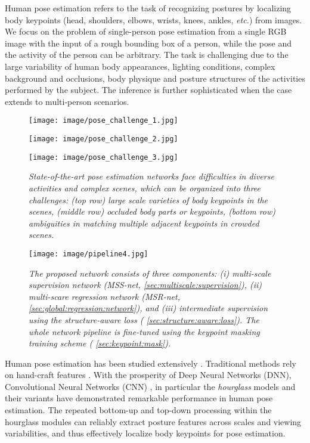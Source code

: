 \documentclass[runningheads]{llncs}
\begin{document}
Human pose estimation refers to the task of recognizing postures by localizing body keypoints (head, shoulders, elbows, wrists, knees, ankles, {\em etc.}) from images. We focus on the problem of single-person pose estimation from a single RGB image with the input of a rough bounding box of a person, while the pose and the activity of the person can be arbitrary. The task is challenging due to the large variability of human body appearances, lighting conditions, complex background and occlusions, body physique and posture structures of the activities performed by the subject.  The inference is further sophisticated when the case extends to multi-person scenarios. 

\begin{figure*}[t]
\centerline{
\texttt{[image: image/pose\_challenge\_1.jpg]}
}
\centerline{
\texttt{[image: image/pose\_challenge\_2.jpg]}
}
\centerline{
\texttt{[image: image/pose\_challenge\_3.jpg]}
}
\caption{\em \small 
State-of-the-art pose estimation networks face difficulties in
diverse activities and complex scenes, which can be organized into three challenges:
(top row) large scale varieties of body keypoints in the scenes,
(middle row) occluded body parts or keypoints,
(bottom row) ambiguities in matching multiple adjacent keypoints in crowded scenes.
}
\label{fig:pose_challenge}
\end{figure*}



\begin{figure*}[t]
\centerline{
  \texttt{[image: image/pipeline4.jpg]}
}
\caption{\em \small 
The proposed network consists of three components: 
{\em (i)} {\em multi-scale supervision network} (MSS-net,  \ref{sec:multiscale:supervision}),
{\em (ii)} {\em multi-scare regression network} (MSR-net,  \ref{sec:global:regression:network}),
and 
{\em (iii)} intermediate supervision using the {\em structure-aware loss} ( \ref{sec:structure:aware:loss}). 
The whole network pipeline is fine-tuned using the {\em keypoint masking training} scheme ( \ref{sec:keypoint:mask}).
}
\label{fig:pipeline}
\end{figure*}


Human pose estimation has been studied extensively \cite{liu2015a}.
Traditional methods rely on hand-craft features \cite{Bourdev:Malik:Poselet:ICCV2009,Charles:BBC:Pose:BMVC2013,Cherian:MixingBodyPart:CVPR2014,Sapp:Taskar:MODEC:CVPR2013,chang_bmvc15}. With the prosperity of Deep Neural Networks (DNN), Convolutional Neural Networks (CNN) \cite{Toshev:DeepPose:CVPR2014,pfister2015flowing,Tompson:Unified:Pose:NIPS2014,Chu:Structured:Learning:Pose:CVPR2016,wei2016convolutional}, in particular the {\em hourglass} models \cite{newell2016stacked} and their variants \cite{chu2017multi,yang2017learning} have demonstrated remarkable performance in human pose estimation. The repeated bottom-up and top-down processing within the hourglass modules can reliably extract posture features across scales and viewing variabilities, and thus effectively localize body keypoints for pose estimation.
 
\end{document}
